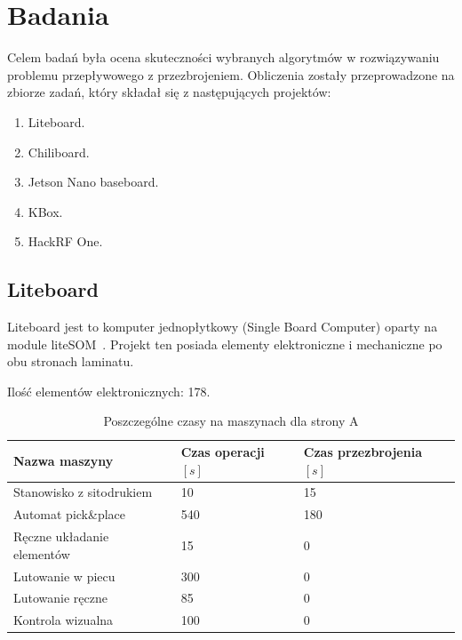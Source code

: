 \chapter{Badania}

Celem badań była ocena skuteczności wybranych algorytmów w rozwiązywaniu problemu przepływowego z przezbrojeniem. Obliczenia zostały przeprowadzone na zbiorze zadań, który składał się z następujących projektów:
\begin{enumerate}
	\item Liteboard.
	\item Chiliboard.
	\item Jetson Nano baseboard.
	\item KBox.
	\item HackRF One.
\end{enumerate}

\newpage
\section{Liteboard}

Liteboard jest to komputer jednopłytkowy (Single Board Computer) oparty na module liteSOM~\cite{liteboard}. Projekt ten posiada elementy elektroniczne i mechaniczne po obu stronach laminatu.

\breakparagraph{}
Ilość elementów elektronicznych: 178.

\begin{table}[H]
	\centering
	\caption{Poszczególne czasy na maszynach dla strony A}
	\begin{tabular}{lll}
		\toprule
		Nazwa maszyny                 & Czas operacji $[s]$ & Czas przezbrojenia $[s]$ \\
		\midrule
		Stanowisko z sitodrukiem      & 10                  & 15                       \\
		Automat pick\&place           & 540                 & 180                      \\
		Ręczne układanie elementów & 15                  & 0                        \\
		Lutowanie w piecu             & 300                 & 0                        \\
		Lutowanie ręczne             & 85                  & 0                        \\
		Kontrola wizualna             & 100                 & 0                        \\
		\bottomrule
	\end{tabular}
\end{table}

